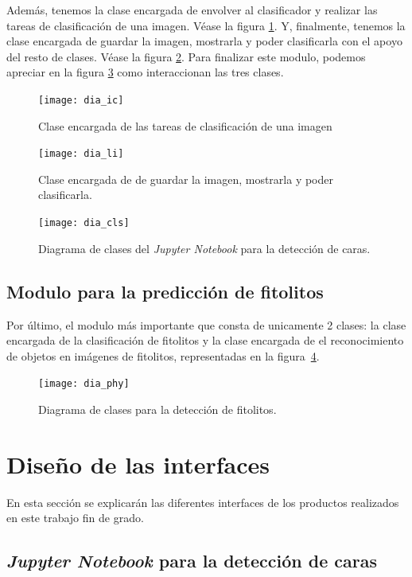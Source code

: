 Además, tenemos la clase encargada de envolver al clasificador y realizar las tareas de clasificación de una imagen. Véase la figura \ref{fig:C.4.4}. Y, finalmente, tenemos la clase encargada de guardar la imagen, mostrarla y poder clasificarla con el apoyo del resto de clases. Véase la figura \ref{fig:C.4.5}. Para finalizar este modulo, podemos apreciar en la figura \ref{fig:C.4.6} como interaccionan las tres clases.

\begin{figure}
\centering
\texttt{[image: dia\_ic]}
\caption{Clase encargada de las tareas de clasificación de una imagen}
\label{fig:C.4.4}
\end{figure}

\begin{figure}
\centering
\texttt{[image: dia\_li]}
\caption[Clases encargadas de la clasificación]{Clase encargada de de guardar la imagen, mostrarla y poder clasificarla.}
\label{fig:C.4.5}
\end{figure}

\begin{figure}
\centering
\texttt{[image: dia\_cls]}
\caption{Diagrama de clases del \textit{Jupyter Notebook} para la detección de caras.}
\label{fig:C.4.6}
\end{figure}

\subsection{Modulo para la predicción de fitolitos}

Por último, el modulo más importante que consta de unicamente 2 clases: la clase encargada de la clasificación de fitolitos y la clase encargada de el reconocimiento de objetos en imágenes de fitolitos, representadas en la figura~\ref{fig:C.4.7}.

\begin{figure}
\centering
\texttt{[image: dia\_phy]}
\caption{Diagrama de clases para la detección de fitolitos.}
\label{fig:C.4.7}
\end{figure}

\section{Diseño de las interfaces}

En esta sección se explicarán las diferentes interfaces de los productos realizados en este trabajo fin de grado.

\subsection{\textit{Jupyter Notebook} para la detección de caras}

